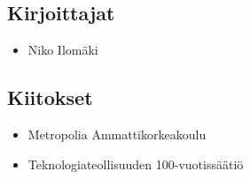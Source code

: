 \subsection*{Kirjoittajat}
\begin{itemize}
\item Niko Ilomäki
\end{itemize}

\subsection*{Kiitokset}
\begin{itemize}
\item Metropolia Ammattikorkeakoulu %
\item Teknologiateollisuuden 100-vuotissäätiö %
\end{itemize}
